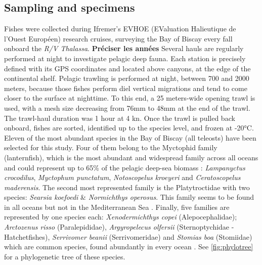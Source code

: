

\subsection{Sampling and specimens}

Fishes were collected during Ifremer's EVHOE (EValuation Halieutique de l'Ouest Européen) research cruises, surveying the Bay of Biscay every fall onboard the \textit{R/V Thalassa}. \textbf{Préciser les années}
Several hauls are regularly performed at night to investigate pelagic deep fauna. Each station is precisely defined with its GPS coordinates and located above canyons, at the edge of the continental shelf. 
Pelagic trawling is performed at night, between 700 and 2000 meters, because those fishes perform diel vertical migrations and tend to come closer to the surface at nighttime. To this end, a 25 meters-wide opening trawl is used, with a mesh size decreasing from 76mm to 48mm at the end of the trawl. The trawl-haul duration was 1 hour at 4 kn. 
Once the trawl is pulled back onboard, fishes are sorted, identified up to the species level, and frozen at -20°C. Eleven of the most abundant species in the Bay of Biscay (all teleosts) have been selected for this study. Four of them belong to the Myctophid family (lanternfish), which is the most abundant and widespread family across all oceans \citep{debusserolles2014} and could represent up to 65\% of the pelagic deep-sea biomass \citep{poulsen2013}: \textit{Lampanyctus crocodilus}, \textit{Myctophum punctatum}, \textit{Notoscopelus kroeyeri} and \textit{Ceratoscopelus maderensis}. The second most represented family is the Platytroctidae with two species: \textit{Searsia koefoedi} \& \textit{Normichthys operosus}. This family seems to be found in all oceans but not in the Mediterranean Sea \citep{orrell2016}. Finally, five families are represented by one species each: \textit{Xenodermichthys copei} (Alepocephalidae); \textit{Arctozenus risso} (Paralepididae), \textit{Argyropelecus olfersii} (Sternoptychidae - Hatchetfishes), \textit{Serrivomer beanii} (Serrivomeridae) and \textit{Stomias boa} (Stomiidae) which are common species, found abundantly in every ocean \citep{carvalho1988,froese2019,geidner2008,germain2019}. See \ref{fig:phylotree} for a phylogenetic tree of these species. 



